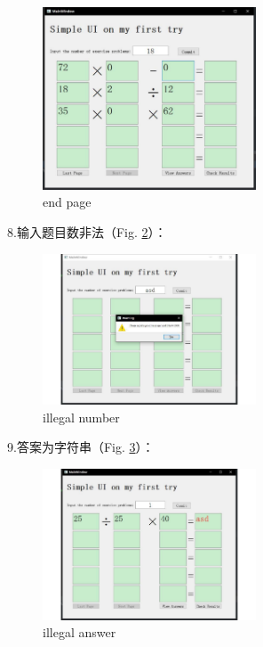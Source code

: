 \documentclass[10pt,journal,compsoc,fleqn]{IEEEtran}
\begin{document}
\begin{CJK}{UTF8}{song}
\begin{figure}[H]
  \centering
  \includegraphics[width=2.5in]{./figures/end_page.pdf}
  \caption{end page}
  \label{end_page}
\end{figure}
\noindent 8.输入题目数非法（Fig. \ref{illegal_num}）：
\begin{figure}[H]
  \centering
  \includegraphics[width=2.5in]{./figures/illegal_num.pdf}
  \caption{illegal number}
  \label{illegal_num}
\end{figure}
\noindent 9.答案为字符串（Fig. \ref{illegal_answer}）：
\begin{figure}[H]
  \centering
  \includegraphics[width=2.5in]{./figures/illegal_answer.pdf}
  \caption{illegal answer}
  \label{illegal_answer}
\end{figure}

\end{CJK}
\end{document}
